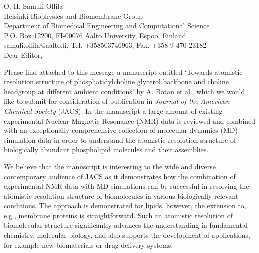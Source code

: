 \documentclass[11pt]{letter}
\begin{document}
\reversemarginpar
\pagestyle{empty}
\noindent O. H. Samuli Ollila \\
\noindent Helsinki Biophysics and Biomembrane Group\\
\noindent Department of Biomedical Engineering and Computational Science\\
\noindent P.O. Box 12200, FI-00076 Aalto University, Espoo, Finland\\
\noindent samuli.ollila@aalto.fi, Tel. +358503746963, Fax. +358 9 470 23182 \\


%
%

Dear Editor,

Please find attached to this message a manuscript entitled `Towards atomistic resolution structure of phosphatidylcholine 
glycerol backbone and choline headgroup at different ambient conditions' by A. Botan et al., which we would like to submit 
for consideration of publication in \textit{Journal of the American Chemical Society} (JACS). In the manuscript a large amount of
existing experimental Nuclear Magnetic Resonance (NMR) data is reviewed and combined with an exceptionally comprehensive 
collection of molecular dynamics (MD) simulation data in order to understand the atomistic resolution structure 
of biologically abundant phospholipid molecules and their assemblies.

We believe that the manuscript is interesting to the wide and diverse contemporary audience of
JACS as it demonstrates how the combination of experimental NMR data with MD simulations can 
be successful in resolving the atomistic resolution structure of biomolecules in various biologically 
relevant conditions. The approach is demonstrated for lipids, however, the extension to, e.g., membrane 
proteins is straightforward. Such an atomistic resolution of biomolecular structure significantly advances 
the understanding in fundamental chemistry, molecular biology, and also supports the development of applications, 
for example new biomaterials or drug delivery systems. 
\end{document}
